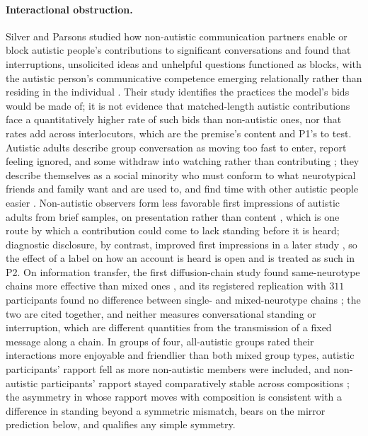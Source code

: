 \paragraph{Interactional obstruction.} Silver and Parsons studied how non-autistic communication partners enable or block autistic people's contributions to significant conversations and found that interruptions, unsolicited ideas and unhelpful questions functioned as blocks, with the autistic person's communicative competence emerging relationally rather than residing in the individual \cite{Silver2025}. Their study identifies the practices the model's bids would be made of; it is not evidence that matched-length autistic contributions face a quantitatively higher rate of such bids than non-autistic ones, nor that rates add across interlocutors, which are the premise's content and P1's to test. Autistic adults describe group conversation as moving too fast to enter, report feeling ignored, and some withdraw into watching rather than contributing \cite{Black2023}; they describe themselves as a social minority who must conform to what neurotypical friends and family want and are used to, and find time with other autistic people easier \cite{Crompton2020b}. Non-autistic observers form less favorable first impressions of autistic adults from brief samples, on presentation rather than content \cite{Sasson2017}, which is one route by which a contribution could come to lack standing before it is heard; diagnostic disclosure, by contrast, improved first impressions in a later study \cite{SassonMorrison2019}, so the effect of a label on how an account is heard is open and is treated as such in P2. On information transfer, the first diffusion-chain study found same-neurotype chains more effective than mixed ones \cite{Crompton2020}, and its registered replication with $311$ participants found no difference between single- and mixed-neurotype chains \cite{Crompton2025}; the two are cited together, and neither measures conversational standing or interruption, which are different quantities from the transmission of a fixed message along a chain. In groups of four, all-autistic groups rated their interactions more enjoyable and friendlier than both mixed group types, autistic participants' rapport fell as more non-autistic members were included, and non-autistic participants' rapport stayed comparatively stable across compositions \cite{Foster2025}; the asymmetry in whose rapport moves with composition is consistent with a difference in standing beyond a symmetric mismatch, bears on the mirror prediction below, and qualifies any simple symmetry.

